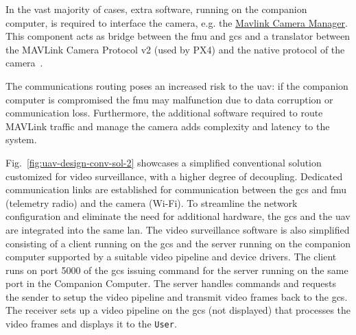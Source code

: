 In the vast majority of cases, extra software, running on the companion
computer, is required to interface the camera, e.g. the \href{https://github.com/mavlink/mavlink-camera-manager}{Mavlink Camera Manager}. This
component acts as bridge between the \gls{fmu} and \gls{gcs} and a translator between the MAVLink Camera Protocol v2
(used by PX4) and the native protocol of the camera~\cite{px4-cam-managers}.

The communications routing poses an increased risk to the \gls{uav}: if the
companion computer is compromised the \gls{fmu} may malfunction due to data
corruption or communication loss. Furthermore, the additional software required
to route MAVLink traffic and manage the camera adds complexity and latency to
the system.

Fig.~\ref{fig:uav-design-conv-sol-2} showcases a simplified conventional
solution customized for video surveillance, with a higher degree of
decoupling. Dedicated
communication links are established for communication between the \gls{gcs} and \gls{fmu} (telemetry radio) and the
camera (Wi-Fi). To streamline the network configuration and eliminate the need
for additional hardware, the \gls{gcs} and the \gls{uav} are integrated into the
same \gls{lan}. The video surveillance software is also simplified consisting of
a client running on the \gls{gcs} and the server running on the companion
computer supported by a suitable video pipeline and device drivers. The
client runs on port 5000 of the \gls{gcs} issuing command for the server running
on the same port in the Companion Computer. The server handles commands and
requests the sender to setup the video pipeline and transmit video frames back
to the \gls{gcs}. The receiver sets up a video pipeline on the \gls{gcs} (not
displayed) that processes the video frames and displays it to the \lstinline{User}.

